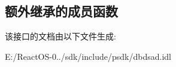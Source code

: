 \subsection*{额外继承的成员函数}


该接口的文档由以下文件生成\+:\begin{DoxyCompactItemize}
\item 
E\+:/\+React\+O\+S-\/0../sdk/include/psdk/dbdsad.\+idl\end{DoxyCompactItemize}
